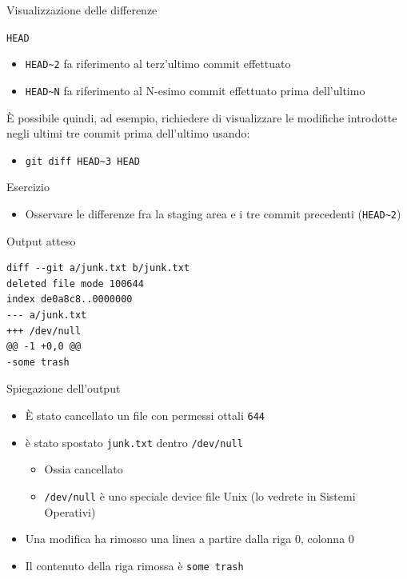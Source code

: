 \documentclass[xcolor=dvipsnames,presentation]{beamer}
\begin{document}
\begin{frame}{Visualizzazione delle differenze}
\begin{block}{\texttt{HEAD}}
\begin{itemize}
			\item \texttt{HEAD\textasciitilde{}2} fa riferimento al terz'ultimo commit effettuato
			\item \texttt{HEAD\textasciitilde{}N} fa riferimento al N-esimo commit effettuato prima dell'ultimo
		\end{itemize}
		È possibile quindi, ad esempio, richiedere di visualizzare le modifiche introdotte negli ultimi tre commit prima dell'ultimo usando:
		\begin{itemize}
			\item \texttt{git diff HEAD\textasciitilde{}3 HEAD}
		\end{itemize}
	\end{block}
	\begin{block}{Esercizio}
		\begin{itemize}
			\item Osservare le differenze fra la staging area e i tre commit precedenti (\texttt{HEAD\textasciitilde{}2})
		\end{itemize}
	\end{block}
	\begin{block}{Output atteso}
		\begin{Verbatim}[fontsize=\scriptsize]
diff --git a/junk.txt b/junk.txt
deleted file mode 100644
index de0a8c8..0000000
--- a/junk.txt
+++ /dev/null
@@ -1 +0,0 @@
-some trash
		\end{Verbatim}
	\end{block}
		\begin{block}{Spiegazione dell'output}
		\begin{itemize}
			\item È stato cancellato un file con permessi ottali \texttt{644}
			\item è stato spostato \texttt{junk.txt} dentro \texttt{/dev/null}
			\begin{itemize}
				\item Ossia cancellato
				\item \texttt{/dev/null} è uno speciale device file Unix (lo vedrete in Sistemi Operativi)
			\end{itemize}
			\item Una modifica ha rimosso una linea a partire dalla riga 0, colonna 0
			\item Il contenuto della riga rimossa è \texttt{some trash}
		\end{itemize}
	\end{block}
\end{frame}
\end{document}
